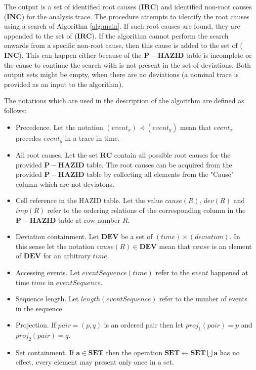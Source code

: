\documentclass[conference]{IEEEtran}
\begin{document}
The output is a set of identified root causes ($\mathbf{IRC}$) and identified non-root causes ($\mathbf{INC}$) for the analysis trace. The procedure attempts to identify the root causes using a search of Algorithm \ref{alg:main}. If such root causes are found, they are appended to the set of ($\mathbf{IRC}$). If the algorithm cannot perform the search onwards from a specific non-root cause, then this cause is added to the set of ($\mathbf{INC}$). This can happen either because of the $\mathbf{P-HAZID}$ table is incomplete or the cause to continue the search with is not present in the set of deviations. Both output sets might be empty, when there are no deviations (a nominal trace is provided as an input to the algorithm).

The notations which are used in the description of the algorithm are defined as follows:

\begin{itemize}
\item Precedence. Let the notation $(event_x) \prec (event_y)$ mean that $event_x$ precedes $event_y$ in a trace in time.
\item All root causes. Let the set $\mathbf{RC}$ contain all possible root causes for the provided $\mathbf{P-HAZID}$ table. The root causes can be acquired from the provided $\mathbf{P-HAZID}$ table by collecting all elements from the "Cause" column which are not deviatons.
\item Cell reference in the HAZID table. Let the value $cause(R)$, $dev(R)$ and $imp(R)$ refer to the ordering relations of the corresponding column
in the $\mathbf{P-HAZID}$ table at row number $R$.
\item Deviation containment. Let $\mathbf{DEV}$ be a set of $(time)\times(deviation)$. In this sense let the notation $cause(R) \in \mathbf{DEV}$ mean that $cause$ is an element of $\mathbf{DEV}$ for an arbitrary $time$.
\item Accessing events. Let $eventSequence(time)$ refer to the $event$ happened at time $time$ in $eventSequence$.
\item Sequence length. Let $length(eventSequence)$ refer to the number of events in the sequence.
\item Projection. If $pair = (p,q)$ is an ordered pair then let $proj_1(pair)=p$ and $proj_2(pair)=q$.
\item Set containment. If $\mathbf{a} \in \mathbf{SET}$ then the operation $\mathbf{SET} \leftarrow \mathbf{SET} \bigcup \mathbf{a}$ has no effect, every element may present only once in a set.
\end{itemize}
\end{document}
